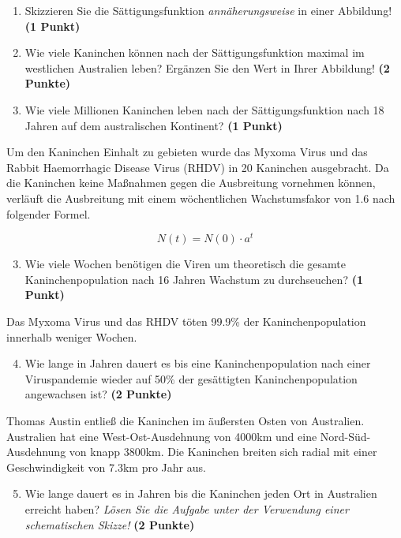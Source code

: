\documentclass[a4paper, 9pt]{scrartcl}\usepackage[]{graphicx}\usepackage[]{xcolor}
\begin{document}
\begin{enumerate}
\item Skizzieren Sie die S{\"a}ttigungsfunktion \textit{ann{\"a}herungsweise} in einer Abbildung! \textbf{(1
    Punkt)}
\item Wie viele Kaninchen k{\"o}nnen nach der S{\"a}ttigungsfunktion maximal im
  westlichen Australien leben? Erg{\"a}nzen Sie den Wert in Ihrer Abbildung! \textbf{(2 Punkte)}
\item Wie viele Millionen Kaninchen leben nach der S{\"a}ttigungsfunktion
  nach 18 Jahren auf dem australischen Kontinent? \textbf{(1
    Punkt)}
\end{enumerate}

Um den Kaninchen Einhalt zu gebieten wurde das Myxoma Virus und das Rabbit
Haemorrhagic Disease Virus (RHDV) in 20 Kaninchen
ausgebracht. Da die Kaninchen keine Ma{\ss}nahmen gegen die Ausbreitung
vornehmen k{\"o}nnen, verl{\"a}uft die Ausbreitung mit einem w{\"o}chentlichen
Wachstumsfakor von 1.6 nach folgender Formel.

\begin{equation*}
  N(t) = N(0) \cdot a^t
\end{equation*}

\begin{enumerate}
  \setcounter{enumi}{2}
\item Wie viele Wochen ben{\"o}tigen die Viren um theoretisch die gesamte
  Kaninchenpopulation nach 16 Jahren Wachstum zu
  durchseuchen? \textbf{(1 Punkt)}
\end{enumerate}

Das Myxoma Virus und das RHDV t{\"o}ten 99.9\% der
Kaninchenpopulation innerhalb weniger Wochen.

\begin{enumerate}
  \setcounter{enumi}{3}  
\item Wie lange in Jahren dauert es bis eine Kaninchenpopulation nach einer
  Viruspandemie wieder auf 50\% der ges{\"a}ttigten
  Kaninchenpopulation angewachsen ist?  \textbf{(2 Punkte)}
\end{enumerate}

Thomas Austin entlie{\ss} die Kaninchen im {\"a}u{\ss}ersten Osten von
Australien. Australien hat eine West-Ost-Ausdehnung von 4000km
und eine Nord-S{\"u}d-Ausdehnung von knapp 3800km. Die Kaninchen
breiten sich radial mit einer Geschwindigkeit von 7.3km pro
Jahr aus.

\begin{enumerate}
  \setcounter{enumi}{4}
\item Wie lange dauert es in Jahren bis die Kaninchen jeden Ort
  in Australien erreicht haben? \textit{L{\"o}sen Sie die Aufgabe unter der
    Verwendung einer schematischen Skizze!} \textbf{(2 Punkte)}
\end{enumerate}
\end{document}
